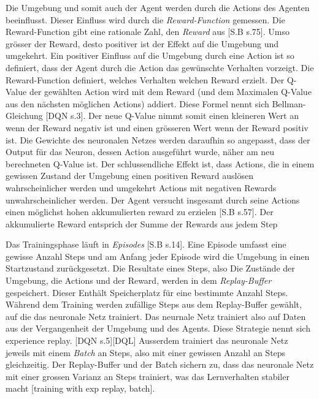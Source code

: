 Die Umgebung und somit auch der Agent werden durch die Actions des Agenten
beeinflusst. Dieser Einfluss wird durch die \emph{Reward-Function} gemessen. Die
Reward-Function gibt eine rationale Zahl, den \emph{Reward} aus [S.B s.75]. Umso grösser
der Reward, desto positiver ist der Effekt auf die Umgebung und umgekehrt. Ein
positiver Einfluss auf die Umgebung durch eine Action ist so definiert, dass der
Agent durch die Action das gewünschte Verhalten vorzeigt. Die Reward-Function
definiert, welches Verhalten welchen Reward erzielt. Der Q-Value der gewählten
Action wird mit dem Reward (und dem Maximalen Q-Value aus den nächsten möglichen
Actions) addiert. Diese Formel nennt sich Bellman-Gleichung [DQN s.3]. Der neue Q-Value          
nimmt somit einen kleineren Wert an wenn der Reward negativ ist und einen
grösseren Wert wenn der Reward positiv ist. Die Gewichte des neuronalen Netzes
werden daraufhin so angepasst, dass der Output für das Neuron, dessen Action
ausgeführt wurde, näher am neu berechneten Q-Value ist. Der schlussendliche
Effekt ist, dass Actions, die in einem gewissen Zustand der Umgebung einen
positiven Reward auslösen wahrscheinlicher werden und umgekehrt Actions mit
negativen Rewards unwahrscheinlicher werden. Der Agent versucht insgesamt durch
seine Actions einen möglichst hohen akkumulierten reward zu erzielen [S.B s.57]. Der
akkumulierte Reward entsprich der Summe der Rewards aus jedem Step

Das Trainingsphase läuft in \emph{Episodes} [S.B s.14]. Eine Episode umfasst
eine gewisse Anzahl Steps und am Anfang jeder Episode wird die Umgebung in einen
Startzustand zurückgesetzt. Die Resultate eines Steps, also Die Zustände der
Umgebung, die Actions und der Reward, werden in dem \emph{Replay-Buffer}
gespeichert. Dieser Enthält Speicherplatz für eine bestimmte Anzahl Steps.
Während dem Training werden zufällige Steps aus dem Replay-Buffer gewählt, auf
die das neuronale Netz trainiert. Das neurnale Netz trainiert also auf Daten aus
der Vergangenheit der Umgebung und des Agents. Diese Strategie nennt sich
experience replay. [DQN s.5][DQL] Ausserdem trainiert das neuronale Netz jeweils mit
einem \emph{Batch} an Steps, also mit einer gewissen Anzahl an Steps
gleichzeitig. Der Replay-Buffer und der Batch sichern zu, dass das neuronale
Netz mit einer grossen Varianz an Steps trainiert, was das Lernverhalten
stabiler macht [training with exp replay, batch].


